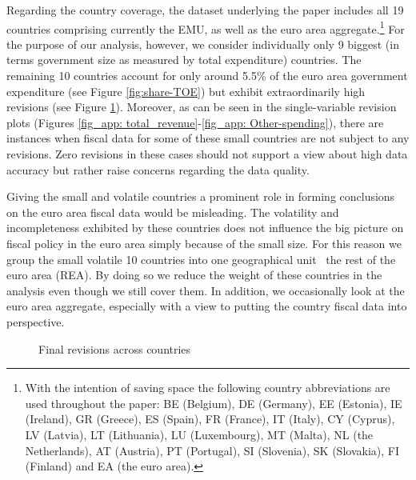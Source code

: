 Regarding the country coverage, the dataset underlying the paper includes
all 19 countries comprising currently the EMU, as well as the euro
area aggregate.\footnote{With the intention of saving space the following country abbreviations
are used throughout the paper: BE (Belgium), DE (Germany), EE (Estonia),
IE (Ireland), GR (Greece), ES (Spain), FR (France), IT (Italy), CY
(Cyprus), LV (Latvia), LT (Lithuania), LU (Luxembourg), MT (Malta),
NL (the Netherlands), AT (Austria), PT (Portugal), SI (Slovenia),
SK (Slovakia), FI (Finland) and EA (the euro area).} For the purpose of our analysis, however, we consider individually only 9 biggest (in terms government size as measured by total expenditure) countries. The remaining 10 countries account for only around 5.5\% of the euro area government expenditure (see Figure \ref{fig:share-TOE}) but exhibit extraordinarily high revisions (see Figure \ref{fig:revisions_exmample}). Moreover, as can be seen in the single-variable revision plots (Figures \ref{fig_app: total_revenue}-\ref{fig_app: Other-spending}), there are instances when fiscal data for some of these small countries are not subject to any revisions. Zero revisions in these cases should not support a view about high data accuracy but rather raise concerns regarding the data quality. 

Giving the small and volatile countries a prominent role in forming conclusions on the euro area fiscal data would be misleading. The volatility and incompleteness exhibited by these countries 
does not influence the big picture on fiscal policy in the euro area simply because 
of the small size. For this reason we group the small volatile 10 countries into one geographical unit \textemdash~the rest of the euro area (REA). By doing so we reduce the weight of these countries in the analysis even though we still cover them. In addition, we occasionally look at the euro area aggregate, especially with a view to putting the country fiscal data into perspective.

\begin{figure}[H]
\begin{centering}
\caption{Final revisions across countries \label{fig:revisions_exmample}}
\par\end{centering}
\begin{centering}
\centering

\par\end{centering}
\end{figure}

